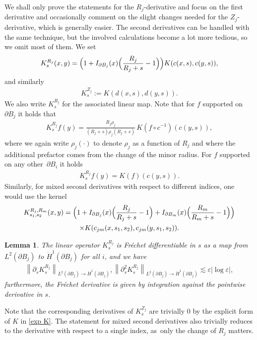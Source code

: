 \documentclass[JEP,XML,SOM,Unicode,published]{cedram}
\let\epsilon\varepsilon
\newtheorem{lemma}[theorem]{Lemma}
\theoremstyle{definition}
\newcommand\norm[1]{\left\lVert #1\right\rVert}
\newcommand\eq{=}
\let\de\partial
\let\eps\epsilon
\begin{document}
We shall only prove the statements for the $R_j$-derivative and focus on the first derivative and occasionally comment on the slight changes needed for the $Z_j$-derivative, which is generally easier. The second derivatives can be handled with the same technique, but the involved calculations become a lot more tedious, so we omit most of them.
We set
\begin{align*}
K_s^{R_j}(x,y)\eq \Bigl(1+I_{\de B_j}(x) \Bigl(\frac{R_j}{R_j+s}-1 \Bigr) \Bigr)K(c(x,s),c(y,s)),
\end{align*}
and similarly
\begin{align*}
K_s^{Z_j}:=K(d(x,s),d(y,s)).
\end{align*}
We also write $K_s^{R_j}$ for the associated linear map. Note that for $f$ supported on $\de B_j$ it holds that
\begin{align*}
K_s^{R_j}f(y)\eq\frac{R_j\rho_j}{(R_j+s)\rho_j(R_j+s)}\,K(f\circ c^{-1})(c(y,s)),
\end{align*}
where we again write $\rho_j(\cdot)$ to denote $\rho_j$ as a function of $R_j$ and where the additional prefactor comes from the change of the minor radius. For $f$ supported on any other~$\de B_i$ it holds
\begin{align*}
K_s^{R_j}f(y)\eq K(f)(c(y,s)).
\end{align*}
Similarly, for mixed second derivatives with respect to different indices, one would use the kernel\vspace*{-5pt}
\begin{multline*}
K_{s_1,s_2}^{R_j,R_m}(x,y)\eq \Bigl(1+I_{\de B_j}(x) \Bigl(\frac{R_j}{R_j+s}-1 \Bigr)+I_{\de B_m}(x) \Bigl(\frac{R_m}{R_m+s}-1 \Bigr) \Bigr)\\
\times K(c_{jm}(x,s_1,s_2),c_{jm}(y,s_1,s_2)).
\end{multline*}

\begin{lemma}\label{deri K}
The linear operator $K_s^{R_j}$ is Fréchet differentiable in $s$ as a map from $L^2(\de B_j)$ to $\dot{H}^1(\de B_j)$ for all $i$, and we have
\begin{align*}
\norm{\de_sK_s^{R_j}}_{L^2(\de B_j)\to \dot{H}^1(\de B_j)},\norm{\de_s^2K_s^{R_j}}_{L^2(\de B_j)\to \dot{H}^1(\de B_j)}\lesssim \eps|{\log\eps}|,
\end{align*}
furthermore, the Fréchet derivative is given by integration against the pointwise derivative in $s$.
\end{lemma}

Note that the corresponding derivatives of $K_s^{Z_j}$ are trivially $0$ by the explicit form of $K$ in \eqref{exp K}. The statement for mixed second derivatives also trivially reduces to the derivative with respect to a single index, as~only the change of $R_j$ matters.
\end{document}
